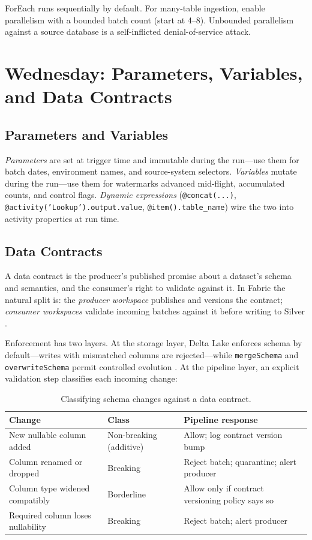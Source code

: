 \begin{tipbox}
ForEach runs sequentially by default. For many-table ingestion, enable parallelism with a bounded batch count (start at 4--8). Unbounded parallelism against a source database is a self-inflicted denial-of-service attack.
\end{tipbox}

\section{Wednesday: Parameters, Variables, and Data Contracts}
\subsection{Parameters and Variables}
\emph{Parameters} are set at trigger time and immutable during the run---use them for batch dates, environment names, and source-system selectors. \emph{Variables} mutate during the run---use them for watermarks advanced mid-flight, accumulated counts, and control flags. \emph{Dynamic expressions} (\texttt{@concat(...)}, \texttt{@activity('Lookup').output.value}, \texttt{@item().table\_name}) wire the two into activity properties at run time.

\subsection{Data Contracts}
A data contract is the producer's published promise about a dataset's schema and semantics, and the consumer's right to validate against it. In Fabric the natural split is: the \emph{producer workspace} publishes and versions the contract; \emph{consumer workspaces} validate incoming batches against it before writing to Silver \cite{microsoftFabricPipelines}.

Enforcement has two layers. At the storage layer, Delta Lake enforces schema by default---writes with mismatched columns are rejected---while \texttt{mergeSchema} and \texttt{overwriteSchema} permit controlled evolution \cite{deltaLakeDocs}. At the pipeline layer, an explicit validation step classifies each incoming change:

\begin{table}[H]
\centering
\small
\begin{tabular}{@{}p{3.4cm}p{4.8cm}p{5.6cm}@{}}
\toprule
\textbf{Change} & \textbf{Class} & \textbf{Pipeline response} \\
\midrule
New nullable column added & Non-breaking (additive) & Allow; log contract version bump \\
Column renamed or dropped & Breaking & Reject batch; quarantine; alert producer \\
Column type widened compatibly & Borderline & Allow only if contract versioning policy says so \\
Required column loses nullability & Breaking & Reject batch; alert producer \\
\bottomrule
\end{tabular}
\caption{Classifying schema changes against a data contract.}
\label{tab:chapter9-contracts}
\end{table}

